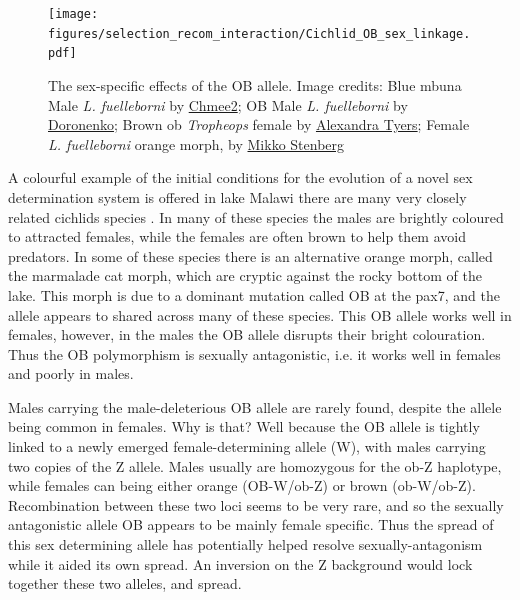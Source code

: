\begin{figure} %
\begin{center}
\texttt{[image: figures/selection\_recom\_interaction/Cichlid\_OB\_sex\_linkage.pdf]}
\end{center}
\caption{The sex-specific effects of the OB allele.  \newline \noindent \tiny{Image credits: Blue mbuna Male  {\it L. fuelleborni} by \href{https://commons.wikimedia.org/wiki/File:Labeotropheus_fuelleborni_in_Botanic_garden_in_Teplice_(2).JPG}{Chmee2}; %
  OB  Male {\it L. fuelleborni} by \href{https://de.wikipedia.org/wiki/Schabemund-Buntbarsch\#/media/File:Labeotropheus_fuelleborni_01.jpg}{Doronenko};
  Brown ob  {\it Tropheops} female by \href{https://www.flickr.com/photos/52993488@N03/4890217915}{Alexandra Tyers};
  Female  {\it L. fuelleborni} orange morph,  by \href{https://commons.wikimedia.org/wiki/File:Labeotropheus_fuelleborni1.jpg}{Mikko Stenberg} 
}}
\end{figure}

A colourful example of the initial conditions for the evolution of a novel sex determination system is offered in lake Malawi there are many very closely related cichlids species \citep{roberts2009sexual}. In many of these species the males are brightly coloured to attracted females, while the females are often brown to help them avoid predators. In some of these species there is an alternative orange morph, called the marmalade cat morph, which are cryptic against the rocky bottom of the lake. This morph is due to a dominant  mutation called OB at the pax7, and the allele appears to shared across many of these species. This OB allele works well in females, however, in the males the OB allele disrupts their bright colouration. Thus the OB polymorphism is sexually antagonistic, i.e. it works well in females and poorly in males.

Males carrying the male-deleterious OB allele are rarely found, despite the allele being common in females. Why is that? Well because the OB allele is tightly linked to a newly emerged female-determining allele (W), with males carrying two copies of the Z allele. Males usually are homozygous for the ob-Z haplotype, while females can being either orange (OB-W/ob-Z) or brown (ob-W/ob-Z). Recombination between these two loci seems to be very rare, and so the sexually antagonistic allele OB appears to be mainly female specific. Thus the spread of this sex determining allele has potentially helped resolve sexually-antagonism while it aided its own spread. An inversion on the Z background would lock together these two alleles, and spread.  

